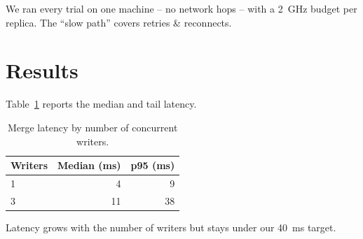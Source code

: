 \documentclass[11pt]{article}
\begin{document}
We ran every trial on one machine -- no network hops -- with a 2~GHz budget
per replica. The ``slow path'' covers retries \& reconnects.

\section{Results}
\label{sec:results}

Table~\ref{tab:latency} reports the median and tail latency.

\begin{table}[h]
  \centering
  \begin{tabular}{lrr}
    Writers & Median (ms) & p95 (ms) \\
    \hline
    1 & 4 & 9 \\
    3 & 11 & 38 \\
  \end{tabular}
  \caption{Merge latency by number of concurrent writers.}
  \label{tab:latency}
\end{table}

Latency grows with the number of writers but stays under our 40~ms target.



\end{document}
